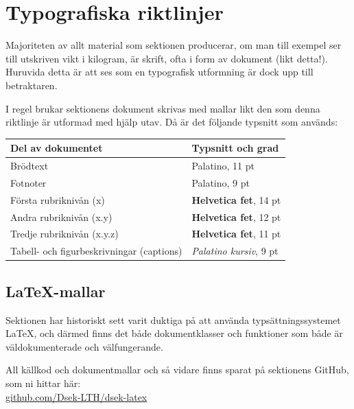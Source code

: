 \documentclass[]{dsekprotokoll}
\begin{document}
\section{Typografiska riktlinjer}
Majoriteten av allt material som sektionen producerar, om man till exempel ser till utskriven vikt i kilogram, är skrift, ofta i form av dokument (likt detta!). Huruvida detta är att ses som en typografisk utformning är dock upp till betraktaren.

I regel brukar sektionens dokument skrivas med mallar likt den som denna riktlinje är utformad med hjälp utav. Då är det följande typsnitt som används:

\begin{table}[!hbp]
    \centering
    \begin{tabular}{ll}
        \toprule
        \textbf{Del av dokumentet}                & \textbf{Typsnitt och grad}                 \\
        \midrule
        Brödtext                                  & Palatino, 11 pt                            \\
        Fotnoter                                  & Palatino, 9 pt                             \\
        Första rubriknivån (x)                    & {\sffamily \bfseries Helvetica fet}, 14 pt \\
        Andra rubriknivån (x.y)                   & {\sffamily \bfseries Helvetica fet}, 12 pt \\
        Tredje rubriknivån (x.y.z)                & {\sffamily \bfseries Helvetica fet}, 11 pt \\
        Tabell- och figurbeskrivningar (captions) & \textit{Palatino kursiv}, 9 pt             \\

        \bottomrule
    \end{tabular}
    \label{tab:my_label}
\end{table}

\subsection{\LaTeX-mallar}
Sektionen har historiskt sett varit duktiga på att använda typsättningssystemet \LaTeX, och därmed finns det både dokumentklasser och funktioner som både är väldokumenterade och välfungerande.

All källkod och dokumentmallar och så vidare finns sparat på sektionens GitHub, som ni hittar här: \\
\href{https://github.com/Dsek-LTH/dsek-latex}{github.com/Dsek-LTH/dsek-latex}
\end{document}
